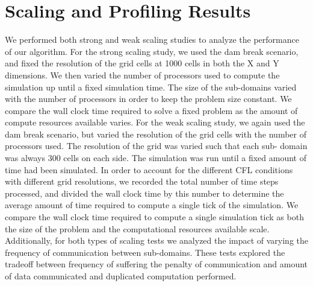 \documentclass{article}
\begin{document}
\section{Scaling and Profiling Results}
We performed both strong and weak scaling studies to analyze the
performance of our algorithm. For the strong scaling study, we used the
dam break scenario, and fixed the resolution of the grid cells at 1000
cells in both the X and Y dimensions. We then varied the number of
processors used to compute the simulation up until a fixed simulation
time. The size of the sub-domains varied with the number of processors in
order to keep the problem size constant. We compare the wall clock time
required to solve a fixed problem as the amount of compute resources
available varies. For the weak scaling study, we again used the dam break
scenario, but varied the resolution of the grid cells with the number of
processors used. The resolution of the grid was varied such that each sub-
domain was always 300 cells on each side. The simulation was run until a
fixed amount of time had been simulated. In order to account for the
different CFL conditions with different grid resolutions, we recorded the
total number of time steps processed, and divided the wall clock time by
this number to determine the average amount of time required to compute a
single tick of the simulation. We compare the wall clock time required to
compute a single simulation tick as both the size of the problem and the
computational resources available scale. Additionally, for both types of
scaling tests we analyzed the impact of varying the frequency of
communication between sub-domains. These tests explored the tradeoff
between frequency of suffering the penalty of communication and amount
of data communicated and duplicated computation performed.
\end{document}
